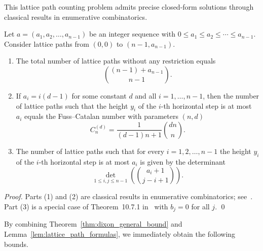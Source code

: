 This lattice path counting problem admits precise closed-form solutions through classical results in enumerative combinatorics.

\begin{lemma}\label{lem:lattice_path_formulas}
	Let $a = (a_1, a_2, \ldots, a_{n-1})$ be an integer sequence with
	$0 \le a_1 \le a_2 \le \cdots \le a_{n-1}$.
	Consider lattice paths from $(0,0)$ to $(n-1,a_{n-1})$.
	
	\begin{enumerate}
		
		\item[(1)] %
		The total number of lattice paths without any restriction equals
		\[
		\binom{(n-1)+a_{n-1}}{n-1}.
		\]
		
		\item[(2)] %
		If $a_i = i(d-1)$ for some constant $d$ and all $i=1,\ldots,n-1$, 
		then the number of lattice paths such that the height $y_i$ of the $i$-th horizontal step is at most $a_i$ equals the Fuss--Catalan number with parameters $(n,d)$
		\begin{equation}\label{eq:fuss_catalan}
			C_n^{(d)} = \frac{1}{(d-1)n+1}\binom{dn}{n}.
		\end{equation}
		
		\item[(3)] %
		The number of lattice paths such that for every 
		$i=1,2,\ldots,n-1$ the height $y_i$ of the $i$-th horizontal step is at most $a_i$ is given by the determinant
		\[
		\det_{1\le i,j\le n-1}
		\left(
		\binom{a_i+1}{j-i+1}
		\right).
		\]
		
	\end{enumerate}
\end{lemma}

\begin{proof}
	Parts (1) and (2) are classical results in enumerative combinatorics; see~\cite{hilton1991catalan,DBLP:journals/dm/Aval08}. Part (3) is a special case of Theorem~10.7.1 in~\cite{bona2015handbook} with $b_j = 0$ for all $j$.
\qed
\end{proof}

By combining Theorem~\ref{thm:dixon_general_bound} and Lemma~\ref{lem:lattice_path_formulas}, we immediately obtain the following bounds.

